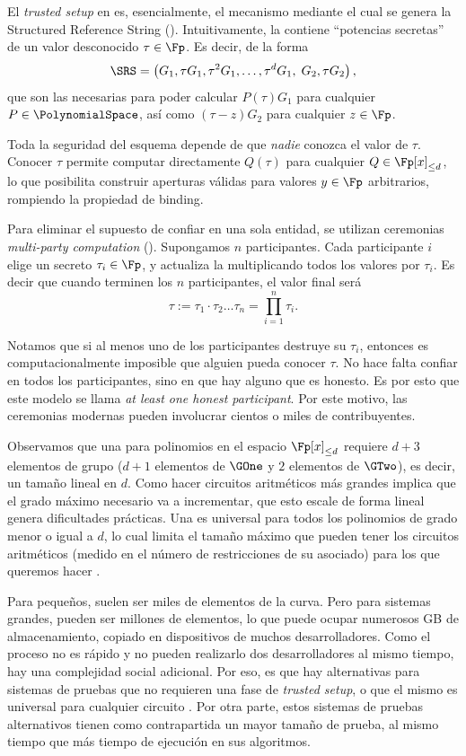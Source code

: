 El \textit{trusted setup} en \KZG es, esencialmente, el mecanismo mediante el cual se genera la Structured Reference String (\SRS). Intuitivamente, la \SRS contiene “potencias secretas” de un valor desconocido $\tau \in \Fp$. Es decir, de la forma
$$\SRS = \left(G_1, \tau G_1, \tau^2 G_1, \ldots, \tau^d G_1,\; G_2, \tau G_2 \right),$$
que son las necesarias para poder calcular $P(\tau)G_1$ para cualquier $P \in \PolynomialSpace$, así como $(\tau - z)G_2$ para cualquier $z \in  \Fp$.

Toda la seguridad del esquema depende de que \emph{nadie} conozca el valor de $\tau$. Conocer $\tau$ permite computar directamente $Q(\tau)$ para cualquier $Q \in \Fp[x]_{\leq d}$, lo que posibilita construir aperturas válidas para valores $y \in \Fp$ arbitrarios, rompiendo la propiedad de binding.

Para eliminar el supuesto de confiar en una sola entidad, se utilizan ceremonias \emph{multi-party computation} (\MPC). Supongamos $n$ participantes. Cada participante $i$ elige un secreto $\tau_i \in \Fp$, y actualiza la \SRS multiplicando todos los valores por $\tau_i$. Es decir que cuando terminen los $n$ participantes, el valor final será
$$\tau := \tau_1 \cdot \tau_2 \ldots \tau_n = \prod_{i=1}^{n} \tau_i.$$

Notamos que si al menos uno de los participantes destruye su $\tau_i$, entonces es computacionalmente imposible que alguien pueda conocer $\tau$. No hace falta confiar en todos los participantes, sino en que hay alguno que es honesto. Es por esto que este modelo se llama \emph{at least one honest participant}. Por este motivo, las ceremonias modernas pueden involucrar cientos o miles de contribuyentes.

Observamos que una \SRS para polinomios en el espacio $ \Fp[x]_{\leq d}$ requiere $d + 3$ elementos de grupo ($d + 1$ elementos de $\GOne$ y $2$ elementos de $\GTwo$), es decir, un tamaño lineal en $d$. Como hacer circuitos aritméticos más grandes implica que el grado máximo necesario va a incrementar, que esto escale de forma lineal genera dificultades prácticas. Una \SRS \KZG es universal para todos los polinomios de grado menor o igual a $d$, lo cual limita el tamaño máximo que pueden tener los circuitos aritméticos (medido en el número de restricciones de su \ROneCS asociado) para los que queremos hacer \SNARK.

Para \SNARK pequeños, suelen ser miles de elementos de la curva. Pero para sistemas grandes, pueden ser millones de elementos, lo que puede ocupar numerosos GB de almacenamiento, copiado en dispositivos de muchos desarrolladores. Como el proceso no es rápido y no pueden realizarlo dos desarrolladores al mismo tiempo, hay una complejidad social adicional. Por eso, es que hay alternativas para sistemas de pruebas que no requieren una fase de \textit{trusted setup}, o que el mismo es universal para cualquier circuito \cite{cryptoeprint:2019/953, BenSasson2017FastRI, cryptoeprint:2018/046}. Por otra parte, estos sistemas de pruebas alternativos tienen como contrapartida un mayor tamaño de prueba, al mismo tiempo que más tiempo de ejecución en sus algoritmos.

